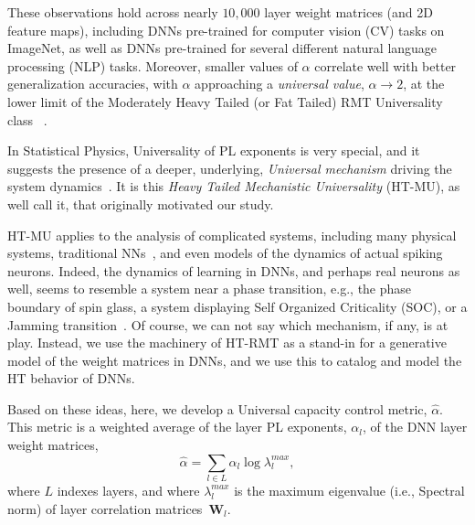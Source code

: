 These observations hold across nearly $10,000$ layer weight matrices (and 2D feature maps), including DNNs pre-trained for computer vision (CV) tasks on ImageNet, as well as DNNs pre-trained for several different natural language processing (NLP) tasks.
Moreover, smaller values of $\alpha$ correlate well with better generalization accuracies, with $\alpha$ approaching a \emph{universal value}, $\alpha\rightarrow 2$, at the lower limit of the Moderately Heavy Tailed (or Fat Tailed) RMT Universality class~\cite{MM18_TR,MM19_HTSR_ICML} .  

In Statistical Physics, Universality of PL exponents is very special, and it suggests the presence of a deeper, underlying, \emph{Universal mechanism} driving the system dynamics~\cite{SornetteBook,BouchaudPotters03}.
It is this \emph{Heavy Tailed Mechanistic Universality} (HT-MU), as well call it, that originally motivated our study.  

HT-MU applies to the analysis of complicated systems, including many physical systems, traditional NNs~\cite{EB01_BOOK,nishimori01}, and even models of the dynamics of actual spiking neurons.
Indeed, the dynamics of learning in DNNs, and perhaps real neurons as well, seems to resemble a system near a phase transition, e.g., the phase boundary of spin glass, a system displaying Self Organized Criticality (SOC), or a Jamming transition~\cite{GSdx18_TR,SGd18_TR}. 
Of course, we can not say which mechanism, if any, is at play. 
Instead, we use the machinery of  HT-RMT as a stand-in for a generative model of the weight matrices in DNNs, and we use this to catalog and model the HT behavior of DNNs.%

Based on these ideas, here, we develop a Universal capacity control metric, $\hat{\alpha}$.
This metric is a weighted average of the layer PL exponents, $\alpha_{l}$, of the DNN layer weight matrices,
\begin{equation}
\hat{\alpha}=\sum_{l\in L}\alpha_{l}\log\lambda_{l}^{max}  ,
\label{eqn:alpha_hat_specific}
\end{equation}
where $L$ indexes layers, and where $\lambda_{l}^{max}$ is the maximum eigenvalue (i.e., Spectral norm) of layer correlation matrices~$\mathbf{W}_{l}$. 

